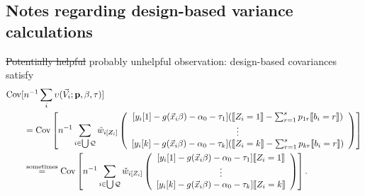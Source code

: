 \documentclass{article}
\DeclarePairedDelimiter{\indicator}{\llbracket}{\rrbracket}
\newcommand{\owt}[1][{[z_{i}]}]{\ensuremath{\check{w}_{i#1}}}
\begin{document}
\subsection{Notes regarding design-based variance calculations}

\st{Potentially helpful} probably unhelpful observation:
design-based covariances satisfy
\begin{align*}
  \operatorname{Cov}[&n^{-1}\sum_{i}\upsilon(\vec{V}_{i};
  \mathbf{p}, \beta, \tau)] \\
                     &=   \operatorname{Cov}\left[n^{-1}\sum_{i \in \bigcup \mathcal{Q}}
                       \owt[{[Z_{i}]}]
\left(
                                             \begin{array}{c}
           {}[y_{i}[1]
                                               -
                                               g(\vec{x}_{i}\beta)-\alpha_{0}-\tau_{1}](
                                               \indicator{Z_{i}=1} - \sum_{r=1}^{s}p_{1r}\indicator{b_{i}=r})\\
                  \vdots \\
{}           [y_{i}[k]
                                               - g(\vec{x}_{i}\beta) - \alpha_{0} -
                                               \tau_{k}](\indicator{Z_{i}=k}
                                               - \sum_{r=1}^{s}p_{kr}\indicator{b_{i}=r})\\                                             \end{array}
\right) \right]\\
                     &\stackrel{\text{sometimes}}{=}  \operatorname{Cov}\left[n^{-1}\sum_{i \in \bigcup \mathcal{Q}}
\owt[{[Z_{i}]}]
\left(
                                             \begin{array}{c}
           {}[y_{i}[1]
                                               -
                                               g(\vec{x}_{i}\beta)-\alpha_{0} -\tau_{1}]
                                               \indicator{Z_{i}=1}\\
                  \vdots \\
{}           [y_{i}[k]
                                               - g(\vec{x}_{i}\beta) - \alpha_{0}-
                                               \tau_{k}]\indicator{Z_{i}=k}\\                                             \end{array}
\right)
\right].
\end{align*}
\end{document}

